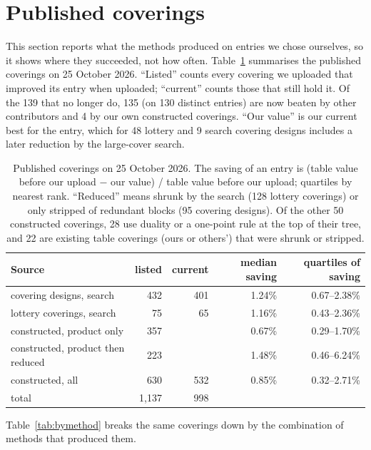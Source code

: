 \documentclass[11pt]{article}
\theoremstyle{remark}
\begin{document}
\section{Published coverings}\label{sec:results}

This section reports what the methods produced on entries we chose ourselves, so it shows where they succeeded,
not how often. Table~\ref{tab:summary} summarises the published coverings on 25 October 2026. ``Listed'' counts every
covering we uploaded that improved its entry when uploaded; ``current'' counts those that still hold it. Of the 139
that no longer do, 135 (on 130 distinct entries) are now beaten by other contributors and 4 by our own constructed coverings. ``Our
value'' is our current best for the entry, which for 48 lottery and 9 search covering designs includes a later
reduction by the large-cover search.

\begin{table}[t]
\centering
\begin{tabular}{lrrrr}
\toprule
Source & listed & current & median saving & quartiles of saving \\
\midrule
covering designs, search & 432 & 401 & 1.24\% & 0.67--2.38\% \\
lottery coverings, search & 75 & 65 & 1.16\% & 0.43--2.36\% \\
constructed, product only & 357 & & 0.67\% & 0.29--1.70\% \\
constructed, product then reduced & 223 & & 1.48\% & 0.46--6.24\% \\
constructed, all & 630 & 532 & 0.85\% & 0.32--2.71\% \\
\midrule
total & 1{,}137 & 998 & & \\
\bottomrule
\end{tabular}
\caption{Published coverings on 25 October 2026. The saving of an entry is (table value before our upload $-$ our
value) / table value before our upload; quartiles by nearest rank. ``Reduced'' means shrunk by the search (128 lottery
coverings) or only stripped of redundant blocks (95 covering designs). Of the other 50 constructed coverings, 28 use
duality or a one-point rule at the top of their tree, and 22 are existing table coverings (ours or others') that were
shrunk or stripped.}
\label{tab:summary}
\end{table}

Table~\ref{tab:bymethod} breaks the same coverings down by the combination of methods that produced them.
\end{document}
